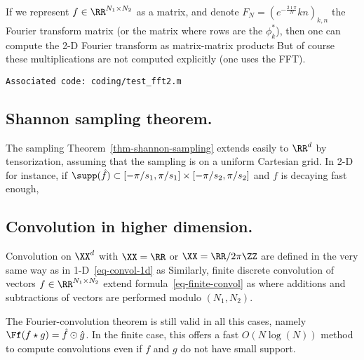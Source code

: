 If we represent $f \in \RR^{N_1 \times N_2}$ as a matrix, and denote $F_N=(e^{-\frac{2\imath\pi}{N}}kn)_{k,n}$ the Fourier transform matrix (or the matrix where rows are the $\phi_k^*$), then one can compute the 2-D Fourier transform as matrix-matrix products
But of course these multiplications are not computed explicitly (one uses the FFT).



\texttt{Associated code: coding/test\_fft2.m}


\subsection{Shannon sampling theorem.}

The sampling Theorem~\ref{thm-shannon-sampling} extends easily to $\RR^d$ by tensorization, assuming that the sampling is on a uniform Cartesian grid. In 2-D for instance, if $\supp(\hat f) \subset [-\pi/s_1,\pi/s_1] \times [-\pi/s_2,\pi/s_2]$ and $f$ is decaying fast enough, 
	

\subsection{Convolution in higher dimension.}

Convolution on $\XX^d$ with $\XX=\RR$ or $\XX=\RR/2\pi\ZZ$ are defined in the very same way as in 1-D~\eqref{eq-convol-1d} as
Similarly, finite discrete convolution of vectors $f \in \RR^{N_1 \times N_2}$ extend formula~\eqref{eq-finite-convol} as
where additions and subtractions of vectors are performed modulo $(N_1,N_2)$.

The Fourier-convolution theorem is still valid in all this cases, namely $\Ff(f \star g)=\hat f \odot \hat g$. In the finite case, this offers a fast $O(N \log(N))$ method to compute convolutions even if $f$ and $g$ do not have small support.



